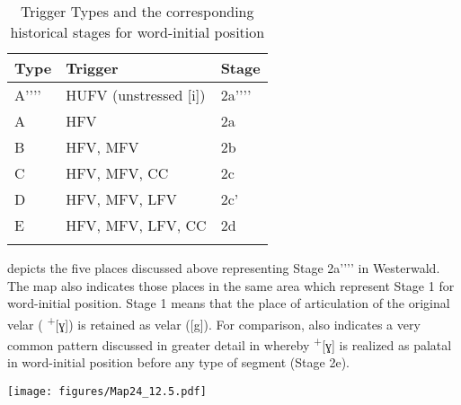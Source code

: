 \begin{table}
\caption{Trigger Types and the corresponding historical stages for word-initial position\label{tab:12.30}}
\begin{tabular}{lll}
\lsptoprule
Type & Trigger & Stage\\\midrule
A'{}'{}'{}' & HUFV (unstressed [i]) & 2a'{}'{}'{}'\\
A & HFV & 2a\\
B & HFV, MFV & 2b\\
C & HFV, MFV, CC & 2c\\
D & HFV, MFV, LFV & 2c'\\
E & HFV, MFV, LFV, CC & 2d\\
\lspbottomrule
\end{tabular}
\end{table}


 depicts the five places discussed above representing Stage 2a'{}'{}'{}' in Westerwald. The map also indicates those places in the same area which represent Stage 1 for word-initial position. Stage 1 means that the place of articulation of the original velar ( \textsuperscript{+}[ɣ]) is retained as velar ([g]). For comparison,  also indicates a very common pattern discussed in greater detail in  whereby  \textsuperscript{+}[ɣ] is realized as palatal in word-initial position before any type of segment (Stage 2e).

\begin{map}
\texttt{[image: figures/Map24\_12.5.pdf]}
\caption[Westerwald]{Westerwald. Circles represent the absence of velar fronting in word-initial position ( \textsuperscript{+}[ɣ] is realized as [g]). White squares indicate the realization of  \textsuperscript{+}[ɣ] as [ʝ] in word-initial position before  ([ə]) and as velar ([g]) in the context before all other vowels as well as consonants (liquids). Lightly shaded squares indicate the realization of  \textsuperscript{+}[ɣ] as a palatal fricative in word-initial position before any type of vowel or consonant (liquid). Sources: \citet{Hommer1910} for  and \citet{CornelissenEtAl1989} for all other places.}\label{map:24}
\end{map}

